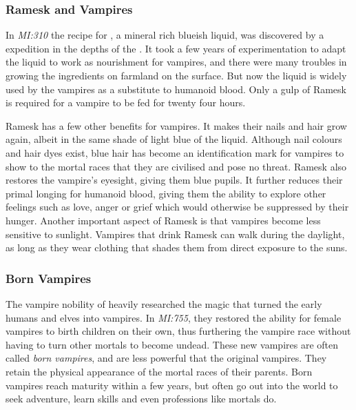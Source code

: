 \subsubsection{Ramesk and Vampires}

In \emph{MI:310} the recipe for , a mineral rich blueish
liquid, was discovered by a  expedition in the depths of
the . It took a few years of experimentation to
adapt the liquid to work as nourishment for vampires, and there were many
troubles in growing the ingredients on farmland on the surface. But now the
liquid is widely used by the vampires as a substitute to humanoid blood. Only
a gulp of Ramesk is required for a vampire to be fed for twenty four hours.

Ramesk has a few other benefits for vampires. It makes their nails and hair
grow again, albeit in the same shade of light blue of the liquid. Although
nail colours and hair dyes exist, blue hair has become an identification mark
for vampires to show to the mortal races that they are civilised and pose no
threat. Ramesk also restores the vampire's eyesight, giving them blue
pupils. It further reduces their primal longing for humanoid blood, giving
them the ability to explore other feelings such as love, anger or grief which
would otherwise be suppressed by their hunger. Another important aspect of
Ramesk is that vampires become less sensitive to sunlight. Vampires that drink
Ramesk can walk during the daylight, as long as they wear clothing that shades
them from direct exposure to the suns.

\subsubsection{Born Vampires}
\label{sec:Born Vampires}

The vampire nobility of  heavily researched the magic
that turned the early humans and elves into vampires. In \emph{MI:755}, they
restored the ability for female vampires to birth children on their own, thus
furthering the vampire race without having to turn other mortals to become
undead. These new vampires are often called \emph{born vampires}, and are less
powerful that the original vampires. They retain the physical appearance of
the mortal races of their parents. Born vampires reach maturity within a few
years, but often go out into the world to seek adventure, learn skills and
even professions like mortals do.

